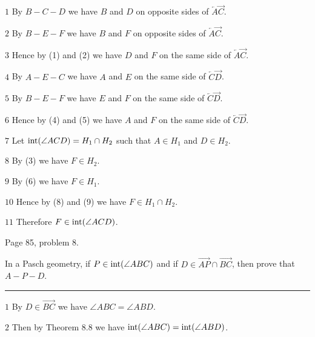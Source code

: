 \bigskip
\item{$\scriptstyle1$}
By $B{-}C{-}D$ we have $B$ and $D$ on opposite sides of $\overleftarrow A\overrightarrow C$.

\medskip
\item{$\scriptstyle2$}
By $B{-}E{-}F$ we have $B$ and $F$ on opposite sides of $\overleftarrow A\overrightarrow C$.

\medskip
\item{$\scriptstyle3$}
Hence by (1) and (2) we have $D$ and $F$ on the same
side of $\overleftarrow A\overrightarrow C$.

\medskip
\item{$\scriptstyle4$}
By $A{-}E{-}C$ we have $A$ and $E$ on the same side of $\overleftarrow C\overrightarrow D$.

\medskip
\item{$\scriptstyle5$}
By $B{-}E{-}F$ we have $E$ and $F$ on the same side of $\overleftarrow C\overrightarrow D$.

\medskip
\item{$\scriptstyle6$}
Hence by (4) and (5) we have $A$ and $F$ on the same side of
$\overleftarrow C\overrightarrow D$.

\medskip
\item{$\scriptstyle7$}
Let $\mathop{\rm int}\nolimits(\angle ACD)=H_1\cap H_2$ such that $A\in H_1$ and $D\in H_2$.

\medskip
\item{$\scriptstyle8$}
By (3) we have $F\in H_2$.

\medskip
\item{$\scriptstyle9$}
By (6) we have $F\in H_1$.

\medskip
\item{$\scriptstyle10$}
Hence by (8) and (9) we have $F\in H_1\cap H_2$.

\medskip
\item{$\scriptstyle11$}
Therefore $F\in \mathop{\rm int}\nolimits(\angle ACD)$.

\vfill
\eject

\beginsection Page 85, problem 8.

In a Pasch geometry, if $P\in \mathop{\rm int}\nolimits(\angle ABC)$ and if
$D\in\overrightarrow{AP}\cap\overrightarrow{BC}$,
then prove that $A{-}P{-}D$.

\medskip
\hrule

\bigskip
\item{$\scriptstyle1$}
By $D\in\overrightarrow{BC}$ we have $\angle ABC=\angle ABD$.

\medskip
\item{$\scriptstyle2$}
Then by Theorem 8.8 we have $\mathop{\rm int}\nolimits(\angle ABC)=\mathop{\rm int}\nolimits(\angle ABD)$.

